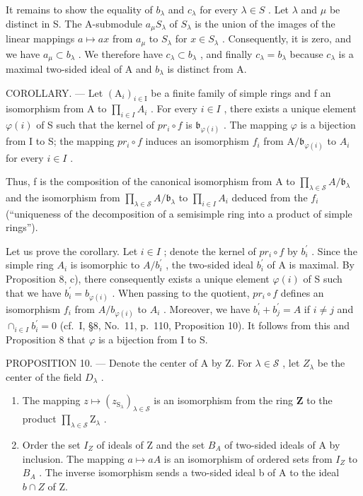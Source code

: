 It remains to show the equality of \(b_{\lambda}\) and \(c_{\lambda}\) for every \(\lambda \in S\) . Let \(\lambda\) and \(\mu\) be distinct in S. The A-submodule \(a_{\mu}S_{\lambda}\) of \(S_{\lambda}\) is the union of the images of the linear mappings \(a \mapsto ax\) from \(a_{\mu}\) to \(S_{\lambda}\) for \(x \in S_{\lambda}\) . Consequently, it is zero, and we have \(a_{\mu} \subset b_{\lambda}\) . We therefore have \(c_{\lambda} \subset b_{\lambda}\) , and finally \(c_{\lambda} = b_{\lambda}\) because \(c_{\lambda}\) is a maximal two-sided ideal of A and \(b_{\lambda}\) is distinct from A.

COROLLARY. --- Let \((\mathrm{A}_{i})_{i\in\mathrm{I}}\) be a finite family of simple rings and f an isomorphism from A to \(\prod_{i\in I}A_{i}\) . For every \(i\in I\) , there exists a unique element \(\varphi(i)\) of S such that the kernel of \(pr_{i}\circ f\) is \(\mathfrak{b}_{\varphi(i)}\) . The mapping \(\varphi\) is a bijection from I to S; the mapping \(pr_{i}\circ f\) induces an isomorphism \(f_{i}\) from \(\mathrm{A}/\mathfrak{b}_{\varphi(i)}\) to \(A_{i}\) for every \(i\in I\) .

Thus, f is the composition of the canonical isomorphism from A to \(\prod_{\lambda\in\mathscr{S}}A/\mathfrak{b}_{\lambda}\) and the isomorphism from \(\prod_{\lambda\in\mathscr{S}}A/\mathfrak{b}_{\lambda}\) to \(\prod_{i\in I}A_{i}\) deduced from the \(f_{i}\) (``uniqueness of the decomposition of a semisimple ring into a product of simple rings'').

Let us prove the corollary. Let \(i \in I\) ; denote the kernel of \(pr_{i} \circ f\) by \(b_{i}^{\prime}\) . Since the simple ring \(A_{i}\) is isomorphic to \(A/b_{i}^{\prime}\) , the two-sided ideal \(b_{i}^{\prime}\) of A is maximal. By Proposition 8, c), there consequently exists a unique element \(\varphi(i)\) of S such that we have \(b_{i}^{\prime} = b_{\varphi(i)}\) . When passing to the quotient, \(pr_{i} \circ f\) defines an isomorphism \(f_{i}\) from \(A/b_{\varphi(i)}\) to \(A_{i}\) . Moreover, we have \(b_{i}^{\prime} + b_{j}^{\prime} = A\) if \(i \neq j\) and \(\cap_{i \in I} b_{i}^{\prime} = 0\) (cf.~I, §8, No.~11, p.~110, Proposition 10). It follows from this and Proposition 8 that \(\varphi\) is a bijection from I to S.

PROPOSITION 10. --- Denote the center of A by Z. For \(\lambda \in \mathcal{S}\) , let \(Z_{\lambda}\) be the center of the field \(D_{\lambda}\) .

\begin{enumerate}
\def\labelenumi{\alph{enumi})}
\item
  The mapping \(z \mapsto (z_{\mathrm{S}_{\lambda}})_{\lambda \in \mathcal{S}}\) is an isomorphism from the ring \(\mathbf{Z}\) to the product \(\prod_{\lambda \in \mathcal{S}}\mathrm{Z}_{\lambda}\) .
\item
  Order the set \(I_{Z}\) of ideals of Z and the set \(B_{A}\) of two-sided ideals of A by inclusion. The mapping \(a \mapsto aA\) is an isomorphism of ordered sets from \(I_{Z}\) to \(B_{A}\) . The inverse isomorphism sends a two-sided ideal b of A to the ideal \(b \cap Z\) of Z.
\end{enumerate}

